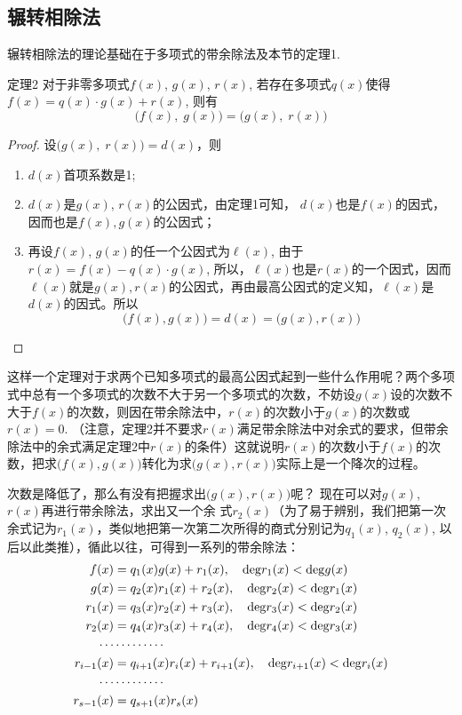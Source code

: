 \subsection{辗转相除法}

辗转相除法的理论基础在于多项式的带余除法及本节的定理1.

\begin{blk}{定理2}
    对于非零多项式$f(x)$, $g(x)$, $r(x)$, 若存在多项式$q(x)$使得$f(x)=q(x)\cdot g(x)+r(x)$, 则有
    \[\big(f(x),\; g(x)\big)=\big(g(x),\; r(x)\big)\]
\end{blk}

\begin{proof}
设$\big(g(x),\; r(x)\big)=d(x)$，则
\begin{enumerate}
\item $d(x)$首项系数是1;
\item $d(x)$是$g(x)$, $r(x)$的公因式，由定理1可知，
$d(x)$也是$f(x)$的因式，因而也是$f(x),g(x)$的公因式；    
\item 再设$f(x)$, $g(x)$的任一个公因式为$\ell(x)$, 由于$r(x)=f(x)-q(x)\cdot g(x)$, 所以，$\ell(x)$也是$r(x)$的一个因式，因而$\ell(x)$就是$g(x),r(x)$的公因式，再由最高公因式的定义知，$\ell(x)$是$d(x)$的因式。所以
\[\big(f (x) ,g (x) \big) =d (x) = \big(g (x) ,r (x) \big)\]
\end{enumerate}
\end{proof}

这样一个定理对于求两个已知多项式的最高公因式起到一些什么作用呢？两个多项式中总有一个多项式的次数不大于另一个多项式的次数，不妨设$g(x)$设的次数不大于$f(x)$的次数，则因在带余除法中，$r(x)$的次数小于$g(x)$的次数或$r(x)=0$. （注意，定理2并不要求$r(x)$满足带余除法中对余式的要求，但带余除法中的余式满足定理2中$r(x)$的条件）这就说明$r(x)$的次数小于$f(x)$的次数，把求$\big(f(x), g(x)\big)$转化为求$\big(g(x), r(x)\big)$实际上是一个降次的过程。

次数是降低了，那么有没有把握求出$\big(g(x),r(x)\big)$呢？
现在可以对$g(x)$, $r(x)$再进行带余除法，求出又一个余
式$r_2(x)$（为了易于辨别，我们把第一次余式记为$r_1(x)$，类似地把第一次第二次所得的商式分别记为$q_1(x)$, $q_2(x)$, 以后以此类推），循此以往，可得到一系列的带余除法：
\begin{equation}
    \begin{split}
f(x)&=q_1(x)g(x)+r_1(x),\quad {\rm deg}r_1(x)<{\rm deg}g(x)\\
g(x)&=q_2(x)r_1(x)+r_2(x),\quad {\rm deg}r_2(x)<{\rm deg}r_1(x)\\
r_1(x)&=q_3(x)r_2(x)+r_3(x),\quad {\rm deg}r_3(x)<{\rm deg}r_2(x)\\
r_2(x)&=q_4(x)r_3(x)+r_4(x),\quad {\rm deg}r_4(x)<{\rm deg}r_3(x)\\
\cdots &\cdots \cdots \cdots \\
r_{i-1}(x)&=q_{i+1}(x)r_i(x)+r_{i+1}(x),\quad {\rm deg}r_{i+1}(x)<{\rm deg}r_i(x)\\
\cdots &\cdots \cdots \cdots \\
r_{s-1}(x)&=q_{s+1}(x)r_s(x)
\end{split}
\end{equation}

